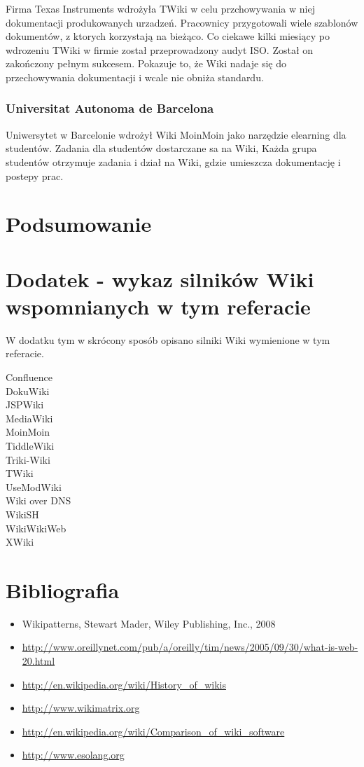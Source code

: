 \documentclass{article}
\begin{document}
Firma Texas Instruments wdrożyła TWiki w celu przchowywania w niej dokumentacji produkowanych urzadzeń. Pracownicy przygotowali wiele szablonów dokumentów, z ktorych korzystają na bieżąco. Co ciekawe kilki miesiący po wdrozeniu TWiki w firmie został przeprowadzony audyt ISO. Został on zakończony pełnym sukcesem. Pokazuje to, że Wiki nadaje się do przechowywania dokumentacji i wcale nie obniża standardu.

\subsubsection{Universitat Autonoma de Barcelona } 

Uniwersytet w Barcelonie wdrożył Wiki MoinMoin jako narzędzie elearning dla studentów.
Zadania dla studentów dostarczane sa na Wiki, Każda grupa studentów otrzymuje zadania i dział na Wiki, gdzie umieszcza dokumentację i postepy prac.

\newpage
\section{Podsumowanie}

\newpage
\section{Dodatek - wykaz silników Wiki wspomnianych w tym referacie}
W dodatku tym w skrócony sposób opisano silniki Wiki wymienione w tym referacie.

\begin{description}
	\item[Confluence]  
	\item[DokuWiki]
	\item[JSPWiki] 
	\item[MediaWiki]
	\item[MoinMoin]
	\item[TiddleWiki]
	\item[Triki-Wiki]
	\item[TWiki]
	\item[UseModWiki]
	\item[Wiki over DNS]
	\item[WikiSH]
	\item[WikiWikiWeb]
	\item[XWiki]
\end{description}


\newpage
\section{Bibliografia}
	\begin{itemize}
		\item 	Wikipatterns, Stewart Mader, Wiley Publishing, Inc., 2008
 		\item \url{http://www.oreillynet.com/pub/a/oreilly/tim/news/2005/09/30/what-is-web-20.html}
		\item \url{http://en.wikipedia.org/wiki/History_of_wikis}
		\item \url{http://www.wikimatrix.org}
		\item \url{http://en.wikipedia.org/wiki/Comparison_of_wiki_software}
		\item \url{http://www.esolang.org}
	\end{itemize}
\end{document}
